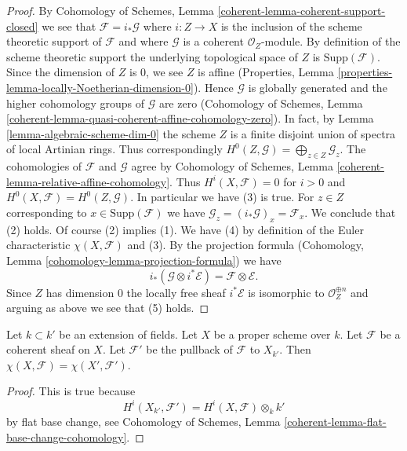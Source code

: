 \begin{proof}
By Cohomology of Schemes, Lemma \ref{coherent-lemma-coherent-support-closed}
we see that $\mathcal{F} = i_*\mathcal{G}$ where $i : Z \to X$ is the inclusion
of the scheme theoretic support of $\mathcal{F}$ and where $\mathcal{G}$
is a coherent $\mathcal{O}_Z$-module. By definition of the scheme theoretic
support the underlying topological space of $Z$ is $\text{Supp}(\mathcal{F})$.
Since the dimension of $Z$ is $0$, we see $Z$ is affine (Properties, Lemma
\ref{properties-lemma-locally-Noetherian-dimension-0}).
Hence $\mathcal{G}$ is globally generated and the higher
cohomology groups of $\mathcal{G}$ are zero
(Cohomology of Schemes, Lemma
\ref{coherent-lemma-quasi-coherent-affine-cohomology-zero}).
In fact, by Lemma \ref{lemma-algebraic-scheme-dim-0}
the scheme $Z$ is a finite disjoint union of spectra
of local Artinian rings. Thus correspondingly
$H^0(Z, \mathcal{G}) = \bigoplus_{z \in Z} \mathcal{G}_z$.
The cohomologies of $\mathcal{F}$ and $\mathcal{G}$ agree by
Cohomology of Schemes, Lemma \ref{coherent-lemma-relative-affine-cohomology}.
Thus $H^i(X, \mathcal{F}) = 0$ for $i > 0$ and
$H^0(X, \mathcal{F}) = H^0(Z, \mathcal{G})$.
In particular we have (3) is true.
For $z \in Z$ corresponding to $x \in \text{Supp}(\mathcal{F})$
we have $\mathcal{G}_z = (i_*\mathcal{G})_x = \mathcal{F}_x$.
We conclude that (2) holds. Of course (2) implies (1).
We have (4) by definition of the Euler characteristic $\chi(X, \mathcal{F})$
and (3). By the projection formula
(Cohomology, Lemma \ref{cohomology-lemma-projection-formula}) we have
$$
i_*(\mathcal{G} \otimes i^*\mathcal{E}) = \mathcal{F} \otimes \mathcal{E}.
$$
Since $Z$ has dimension $0$ the locally free sheaf $i^*\mathcal{E}$
is isomorphic to $\mathcal{O}_Z^{\oplus n}$ and arguing as above
we see that (5) holds.
\end{proof}

\begin{lemma}
\label{lemma-euler-characteristic-extend-base-field}
Let $k \subset k'$ be an extension of fields. Let $X$ be a proper scheme
over $k$. Let $\mathcal{F}$ be a coherent sheaf on $X$.
Let $\mathcal{F}'$ be the pullback of $\mathcal{F}$ to $X_{k'}$.
Then $\chi(X, \mathcal{F}) = \chi(X', \mathcal{F}')$.
\end{lemma}

\begin{proof}
This is true because
$$
H^i(X_{k'}, \mathcal{F}') = H^i(X, \mathcal{F}) \otimes_k k'
$$
by flat base change, see
Cohomology of Schemes, Lemma \ref{coherent-lemma-flat-base-change-cohomology}.
\end{proof}

